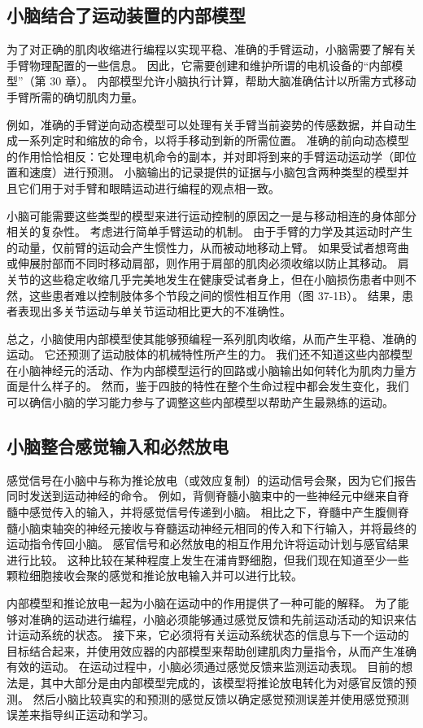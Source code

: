 \subsection{小脑结合了运动装置的内部模型}
为了对正确的肌肉收缩进行编程以实现平稳、准确的手臂运动，小脑需要了解有关手臂物理配置的一些信息。 因此，它需要创建和维护所谓的电机设备的“内部模型”（第 30 章）。 内部模型允许小脑执行计算，帮助大脑准确估计以所需方式移动手臂所需的确切肌肉力量。

例如，准确的手臂逆向动态模型可以处理有关手臂当前姿势的传感数据，并自动生成一系列定时和缩放的命令，以将手移动到新的所需位置。 准确的前向动态模型的作用恰恰相反：它处理电机命令的副本，并对即将到来的手臂运动运动学（即位置和速度）进行预测。 小脑输出的记录提供的证据与小脑包含两种类型的模型并且它们用于对手臂和眼睛运动进行编程的观点相一致。

小脑可能需要这些类型的模型来进行运动控制的原因之一是与移动相连的身体部分相关的复杂性。 考虑进行简单手臂运动的机制。 由于手臂的力学及其运动时产生的动量，仅前臂的运动会产生惯性力，从而被动地移动上臂。 如果受试者想弯曲或伸展肘部而不同时移动肩部，则作用于肩部的肌肉必须收缩以防止其移动。 肩关节的这些稳定收缩几乎完美地发生在健康受试者身上，但在小脑损伤患者中则不然，这些患者难以控制肢体多个节段之间的惯性相互作用（图 37-1B）。 结果，患者表现出多关节运动与单关节运动相比更大的不准确性。

总之，小脑使用内部模型使其能够预编程一系列肌肉收缩，从而产生平稳、准确的运动。 它还预测了运动肢体的机械特性所产生的力。 我们还不知道这些内部模型在小脑神经元的活动、作为内部模型运行的回路或小脑输出如何转化为肌肉力量方面是什么样子的。 然而，鉴于四肢的特性在整个生命过程中都会发生变化，我们可以确信小脑的学习能力参与了调整这些内部模型以帮助产生最熟练的运动。

\subsection{小脑整合感觉输入和必然放电}
感觉信号在小脑中与称为推论放电（或效应复制）的运动信号会聚，因为它们报告同时发送到运动神经的命令。 例如，背侧脊髓小脑束中的一些神经元中继来自脊髓中感觉传入的输入，并将感觉信号传递到小脑。 相比之下，脊髓中产生腹侧脊髓小脑束轴突的神经元接收与脊髓运动神经元相同的传入和下行输入，并将最终的运动指令传回小脑。 感官信号和必然放电的相互作用允许将运动计划与感官结果进行比较。 这种比较在某种程度上发生在浦肯野细胞，但我们现在知道至少一些颗粒细胞接收会聚的感觉和推论放电输入并可以进行比较。

内部模型和推论放电一起为小脑在运动中的作用提供了一种可能的解释。 为了能够对准确的运动进行编程，小脑必须能够通过感觉反馈和先前运动活动的知识来估计运动系统的状态。 接下来，它必须将有关运动系统状态的信息与下一个运动的目标结合起来，并使用效应器的内部模型来帮助创建肌肉力量指令，从而产生准确有效的运动。 在运动过程中，小脑必须通过感觉反馈来监测运动表现。 目前的想法是，其中大部分是由内部模型完成的，该模型将推论放电转化为对感官反馈的预测。 然后小脑比较真实的和预测的感觉反馈以确定感觉预测误差并使用感觉预测误差来指导纠正运动和学习。

